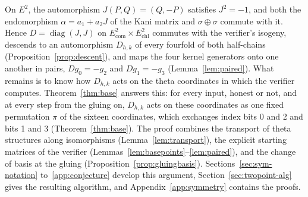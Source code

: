 \documentclass[version=preprint]{iacrcc}
\newcommand{\Ecom}{E_{\mathrm{com}}}
\newcommand{\Echl}{E_{\mathrm{chl}}}
\begin{document}
    On $E^2$, the automorphism $J(P, Q) = (Q, -P)$ satisfies $J^2 = -1$, and
    both the endomorphism $\alpha = a_1 + a_2 J$ of the Kani matrix and
    $\sigma \oplus \sigma$ commute with it. Hence $D = \operatorname{diag}(J,
    J)$ on $\Ecom^2 \times \Echl^2$ commutes with the verifier's isogeny,
    descends to an automorphism $D_{h,k}$ of every fourfold of both
    half-chains (Proposition~\ref{prop:descent}), and maps the four kernel
    generators onto one another in pairs, $D g_0 = -g_2$ and $D g_1 = -g_3$
    (Lemma~\ref{lem:paired}). What remains is to know how $D_{h,k}$ acts on
    the theta coordinates in which the verifier computes. Theorem~\ref{thm:base}
    answers this: for every input, honest or not, and at every step from the
    gluing on, $D_{h,k}$ acts on these coordinates as one fixed permutation
    $\pi$ of the sixteen coordinates, which exchanges index bits 0 and 2 and
    bits 1 and 3 (Theorem~\ref{thm:base}). The proof combines the transport of
    theta structures along isomorphisms (Lemma~\ref{lem:transport}), the
    explicit starting matrices of the verifier
    (Lemmas~\ref{lem:basepoints}--\ref{lem:paired}), and the change of basis at
    the gluing (Proposition~\ref{prop:gluingbasis}). Sections~\ref{sec:sym-notation}
    to~\ref{app:conjecture} develop this argument,
    Section~\ref{sec:twopoint-alg} gives the resulting algorithm, and
    Appendix~\ref{app:symmetry} contains the proofs.
\end{document}
